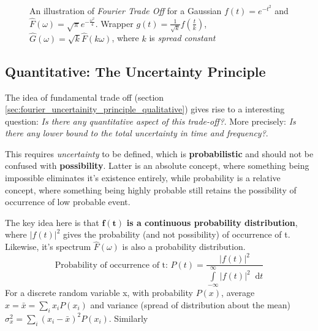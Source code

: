 \documentclass[11pt, a4paper]{article}
\newcommand{\quotedsingle}[1]{#1}	%
\newcommand{\quotedsingleit}[1]{\quotedsingle{\textit{#1}}}	%
\newcommand{\variance}[1]{\sigma_{#1}^{2}}
\newcommand{\diff}{\mathop{}\!\mathrm{d}}
\newcommand{\dt}{\diff t}
\newcommand{\dint}[2]{\int \limits_{#1}^{#2}}  %
\newcommand{\intinfty}{\dint{-\infty}{\infty}}	%
\begin{document}
\begin{figure}[H]
		\caption{An illustration of \textit{Fourier Trade Off} for a Gaussian $f(t) = e^{-t^2}$ and $\hat{F}(\omega) = \sqrt{\pi} e^{-\frac{\omega^2}{4}}$. Wrapper $g(t)=\frac{1}{\sqrt{k}} f \left( \frac{t}{k} \right)$, $\hat{G}(\omega) = \sqrt{k} \hat{F}(k \omega)$, where $k$ is \textit{spread constant}}
		
		\label{fig:fourier_tradeoff}  %
	\end{figure}
	
	\subsection{Quantitative: The Uncertainty Principle}
	The idea of fundamental trade off (section \ref{sec:fourier_uncertainity_principle_qualitative}) gives rise to a interesting question: \textit{Is there any quantitative aspect of this trade-off?}. More precisely: \textit{Is there any lower bound to the total uncertainty in time and frequency?}.
	
	This requires \quotedsingleit{uncertainty} to be defined, which is \textbf{probabilistic} and should not be confused with \textbf{possibility}. Latter is an absolute concept, where something being impossible eliminates it's existence entirely, while probability is a relative concept, where something being highly probable still retains the possibility of occurrence of low probable event.
	
	The key idea here is that $\boldsymbol{f(t)}$ \textbf{is a continuous probability distribution}, where $|f(t)|^{2}$ gives the probability (and not possibility) of occurrence of t. Likewise, it's spectrum $\hat{F}(\omega)$ is also a probability distribution.
	\begin{equation*}
		\text{Probability of occurrence of t: }P(t) = \frac{|f(t)|^{2}}{\intinfty |f(t)|^{2} \dt}
	\end{equation*}
	For a discrete random variable x, with probability $P(x)$, average $x = \bar{x} = \sum \limits_{i} x_{i} P(x_{i})$ and variance (spread of distribution about the mean) $ \variance{x} = \sum \limits_{i} (x_{i} - \bar{x})^{2} P(x_{i})$. Similarly
	
\end{document}
